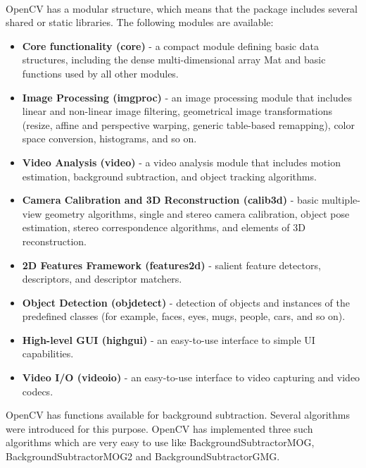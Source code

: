 \documentclass{scrreprt}
\begin{document}
\begin{itemize}
    \\OpenCV has a modular structure, which means that the package includes several shared or static libraries. The following modules are available:
    \begin{itemize}
        \item \textbf{Core functionality (core)} - a compact module defining basic data structures, including the dense multi-dimensional array Mat and basic functions used by all other modules.
        \item \textbf{Image Processing (imgproc)} - an image processing module that includes linear and non-linear image filtering, geometrical image transformations (resize, affine and perspective warping, generic table-based remapping), color space conversion, histograms, and so on.
        \item \textbf{Video Analysis (video)} - a video analysis module that includes motion estimation, background subtraction, and object tracking algorithms.
        \item \textbf{Camera Calibration and 3D Reconstruction (calib3d)} - basic multiple-view geometry algorithms, single and stereo camera calibration, object pose estimation, stereo correspondence algorithms, and elements of 3D reconstruction.
        \item \textbf{2D Features Framework (features2d)} - salient feature detectors, descriptors, and descriptor matchers.
        \item \textbf{Object Detection (objdetect)} - detection of objects and instances of the predefined classes (for example, faces, eyes, mugs, people, cars, and so on).
        \item \textbf{High-level GUI (highgui)} - an easy-to-use interface to simple UI capabilities.
        \item \textbf{Video I/O (videoio)} - an easy-to-use interface to video capturing and video codecs.
    \end{itemize}


    OpenCV has functions available for background subtraction. Several algorithms were introduced for this purpose. OpenCV has implemented three such algorithms which are very easy to use like BackgroundSubtractorMOG, BackgroundSubtractorMOG2 and BackgroundSubtractorGMG.
    

\end{itemize}
\end{document}
